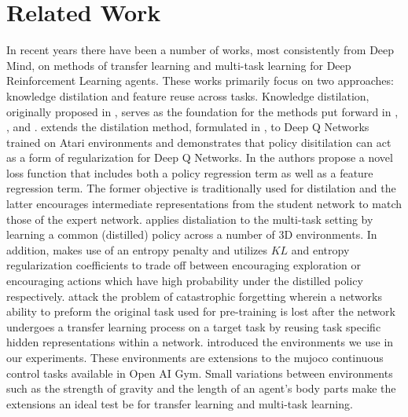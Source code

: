 \section{Related Work}
In recent years there have been a number of works, most consistently from Deep Mind, on methods
of transfer learning and multi-task learning for Deep Reinforcement Learning agents.
These works primarily focus on two approaches: knowledge distilation and feature reuse
across tasks. Knowledge distilation, originally proposed in \cite{seven}, serves as the foundation
for the methods put forward in \cite{two}, \cite{one}, and \cite{five}.
\cite{two} extends the distilation method, formulated in \cite{six},
to Deep Q Networks trained on Atari environments and demonstrates that policy disitilation
can act as a form of regularization for Deep Q Networks. In \cite{one} the authors propose a novel
loss function that includes both a policy regression term as well as a feature regression
term. The former objective is traditionally used for distilation and the latter encourages
intermediate representations from the student network to match those of the expert network.
\cite{five} applies distaliation to the multi-task setting by learning a common (distilled)
policy across a number of 3D environments. In addition, \cite{five} makes use of an entropy penalty and
utilizes $KL$ and entropy regularization coefficients to trade off between encouraging
exploration or encouraging actions which have high probability under the distilled policy respectively.
\cite{three} attack the problem of catastrophic forgetting wherein a networks ability to
preform the original task used for pre-training is lost after the network undergoes
a transfer learning process on a target task by reusing task specific hidden representations within a network.
\cite{four} introduced the environments we use in our experiments. These environments are extensions to the
mujoco continuous control tasks available in Open AI Gym. Small variations between environments
such as the strength of gravity and the length of an agent's body parts make the extensions
an ideal test be for transfer learning and multi-task learning.

